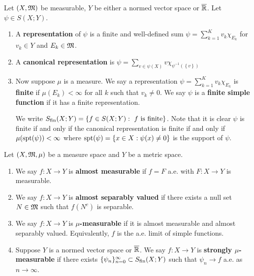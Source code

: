 \documentclass[a4paper]{article}
\begin{document}
\begin{defi}

Let $(X, \mathfrak{M})$ be measurable, $Y$ be either a normed vector
space or $\overline{\mathbb{R}}$. Let $\psi \in S(X; Y)$.
\begin{enumerate}
  \item A \textbf{representation} of $\psi$ is a finite and
  well-defined sum
  $\psi = \sum_{k=1}^K v_k \chi_{E_k}$
  for $v_k \in Y$ and $E_k \in \mathfrak{M}$.

  \item A \textbf{canonical representation} is
  $\psi = \sum_{v \in \psi(X)} v \chi_{\psi^{-1}
  (\left\{ v \right\})}$
  \item Now suppose $\mu$ is a measure.
  We say a representation $\psi = \sum_{k=1}^K
  v_k \chi_{E_k}$ is \textbf{finite} if $\mu(E_k) < \infty$
  for all $k$ such that $v_k \neq 0$. We
  say $\psi$ is a \textbf{finite simple function} if it has a
  finite representation.

  We write $S_{\text{fin}}(X; Y) = \left\{
    f \in S(X; Y) : \text{ $f$ is finite}
   \right\}$.
  Note that it is clear $\psi$ is finite if and only if
  the canonical representation is finite if and only if
  $\mu(\operatorname{spt}(\psi)) < \infty$ where
  $\operatorname{spt}(\psi) = \left\{ x \in X : \psi(x) \neq 0 \right\}$
  is the support of $\psi$.
\end{enumerate}

\end{defi}

\begin{defi}
  Let $(X, \mathfrak{M}, \mu)$ be a measure space and $Y$ be a metric
  space.
  \begin{enumerate}
    \item We say $f : X \to Y$ is \textbf{almost measurable}
    if $f = F$ a.e. with $F: X \to Y$ is measurable.

    \item We say $f : X \to Y$ is \textbf{almost separably valued}
    if there exists a null set $N \in \mathfrak{M}$ such that
    $f(N^c)$ is separable.

    \item We say $f: X \to Y$ is \textbf{$\mu$-measurable} if
    it is almost measurable and almost separably valued.
    Equivalently, $f$ is the a.e. limit of simple functions.

    \item Suppose $Y$ is a normed vector space or $\overline{\mathbb{R}}$.
    We say $f: X \to Y$ is \textbf{strongly $\mu$-measurable}
    if there exists $\{ \psi_n \}_{n=0}^\infty \subset S_{\text{fin}}(X; Y)$
    such that $\psi_n \to f$ a.e. as $n \to \infty$.
  \end{enumerate}
\end{defi}
\end{document}
